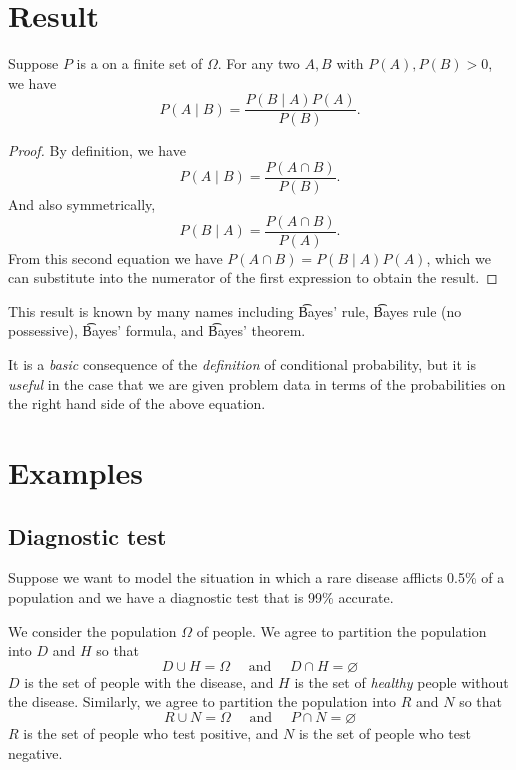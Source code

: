 
\section*{Result}

\begin{proposition}
Suppose $P$ is a on a finite set of $\Omega $.
For any two $A, B$ with $P(A), P(B) > 0$, we have
\[
P(A \mid  B) = \frac{ P(B \mid  A)P(A) }{ P(B) }.
\]
\begin{proof}By definition, we have
\[
P(A \mid  B) = \frac{ P(A \cap  B) }{ P(B) }.
\]
And also symmetrically,
\[
P(B \mid  A) = \frac{ P(A \cap  B) }{ P(A) }.
\]
From this second equation we have $P(A \cap  B) = P(B \mid A) P(A)$, which we can substitute into the numerator of the first expression to obtain the result.\end{proof}
\end{proposition}

This result is known by many names including \t{Bayes' rule}, \t{Bayes rule} (no possessive), \t{Bayes' formula}, and \t{Bayes' theorem}.

It is a \textit{basic} consequence of the \textit{definition} of conditional probability, but it is \textit{useful} in the case that we are given problem data in terms of the probabilities on the right hand side of the above equation.

\section*{Examples}

\subsection*{Diagnostic test}

Suppose we want to model the situation in which a rare disease afflicts 0.5\% of a population and we have a diagnostic test that is 99\% accurate.

We consider the population $\Omega $ of people.
We agree to partition the population into $D$ and $H$ so that
\[
D \cup H = \Omega  \quad \text{ and } \quad D \cap  H = \varnothing
\]
$D$ is the set of people with the disease, and $H$ is the set of \textit{healthy} people without the disease.
Similarly, we agree to partition the population into $R$ and $N$ so that
\[
R \cup N = \Omega  \quad \text{ and } \quad P \cap  N = \varnothing
\]
$R$ is the set of people who test positive, and $N$ is the set of people who test negative.

